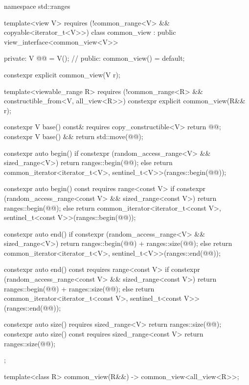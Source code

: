 %
%
%
%
%
\begin{codeblock}
namespace std::ranges {
  template<view V>
    requires (!common_range<V> && copyable<iterator_t<V>>)
  class common_view : public view_interface<common_view<V>> {
  private:
    V @@ = V();  // \expos
  public:
    common_view() = default;

    constexpr explicit common_view(V r);

    template<viewable_range R>
      requires (!common_range<R> && constructible_from<V, all_view<R>>)
    constexpr explicit common_view(R&& r);

    constexpr V base() const& requires copy_constructible<V> { return @@; }
    constexpr V base() && { return std::move(@@); }

    constexpr auto begin() {
      if constexpr (random_access_range<V> && sized_range<V>)
        return ranges::begin(@@);
      else
        return common_iterator<iterator_t<V>, sentinel_t<V>>(ranges::begin(@@));
    }

    constexpr auto begin() const requires range<const V> {
      if constexpr (random_access_range<const V> && sized_range<const V>)
        return ranges::begin(@@);
      else
        return common_iterator<iterator_t<const V>, sentinel_t<const V>>(ranges::begin(@@));
    }

    constexpr auto end() {
      if constexpr (random_access_range<V> && sized_range<V>)
        return ranges::begin(@@) + ranges::size(@@);
      else
        return common_iterator<iterator_t<V>, sentinel_t<V>>(ranges::end(@@));
    }

    constexpr auto end() const requires range<const V> {
      if constexpr (random_access_range<const V> && sized_range<const V>)
        return ranges::begin(@@) + ranges::size(@@);
      else
        return common_iterator<iterator_t<const V>, sentinel_t<const V>>(ranges::end(@@));
    }

    constexpr auto size() requires sized_range<V> {
      return ranges::size(@@);
    }
    constexpr auto size() const requires sized_range<const V> {
      return ranges::size(@@);
    }
  };

  template<class R>
    common_view(R&&) -> common_view<all_view<R>>;
}
\end{codeblock}

